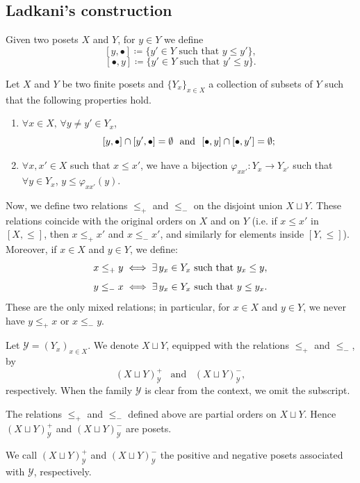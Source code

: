 \subsection{Ladkani's construction} \label{Ladkani's construction}

Given two posets $X$ and $Y$, for $y \in Y$ we define \[[y, \bullet ] \coloneq \{ y' \in Y \,\,\text{such that}\,\,y \leq y' \},\]
\[[\bullet, y ] \coloneq \{ y' \in Y \,\,\text{such that}\,\,y'\leq y \}.\]

Let $X$ and $Y$ be two finite posets and $\{Y_x\}_{x \in X}$ a collection of subsets of $Y$ such that the following properties hold.

\begin{enumerate}[label=(\roman*), ref=(\roman*)]
\item \label{prop:disjoint} $\forall x \in X, \,\forall y \neq y' \in Y_x $, \[
     [y, \bullet ] \cap [y', \bullet ]= \emptyset \text{\,\,\,\,and\,\,\,\,} [\bullet, y ] \cap [\bullet, y' ]= \emptyset;
\]
   
    
    \item \label{prop:phi} $\forall x,x' \in X$ such that $x \leq x'$, we have a bijection
    $\varphi_{xx'} \colon Y_x \to Y_{x'}$ such that $\forall y \in Y_{x}$, 
    $
    y \leq \varphi_{xx'}(y)$.
\end{enumerate}



Now, we define two relations $\leq_+$ and $\leq_-$ on the disjoint union $X \sqcup Y$.
These relations coincide with the original orders on $X$ and on $Y$ (i.e. if $x\leq x'$ in $[X,\leq]$, then $x \leq_+x'$ and $x \leq_- x'$, and similarly for elements inside $[Y,\leq]$).
Moreover, if $x\in X$ and $y \in Y$, we define:
\[x \leq_+y \iff \exists \,  y_x \in Y_x \text{\,\,such that\,\,}y_x \leq y,\]
\[y \leq_-x \iff \exists \,  y_x \in Y_x \text{\,\,such that\,\,}y \leq y_x.\]
These are the only mixed relations; in particular, for $x \in X$ and $y \in Y$, we never have $y \leq_+x$ or $x \leq_-y$.

Let $\mathcal{Y}=(Y_x)_{x \in X}$. We denote $X \sqcup Y$, equipped with the relations $\leq_+$ and $\leq_-$, by 
\[(X \sqcup Y)^+_{\mathcal{Y}}\,\,\,\,\, \text{and}\,\,\,\,\,(X \sqcup Y)^-_{\mathcal{Y}},\] respectively. When the family $\mathcal{Y}$ is clear from the context, we omit the subscript.

\begin{lemma}\label{lemma part ord}\cite[Section 1]{ladkani}
    The relations $\leq_+$ and $\leq_-$ defined above are partial orders on $X \sqcup Y$. Hence  $(X \sqcup Y)^+_{\mathcal{Y}}$ and $(X \sqcup Y)^-_{\mathcal{Y}}$ are posets. 
\end{lemma}
We call $(X \sqcup Y)_{\mathcal{Y}}^+$ and $(X \sqcup Y)^-_{\mathcal{Y}}$ the positive and negative posets associated with $\mathcal{Y}$, respectively.

